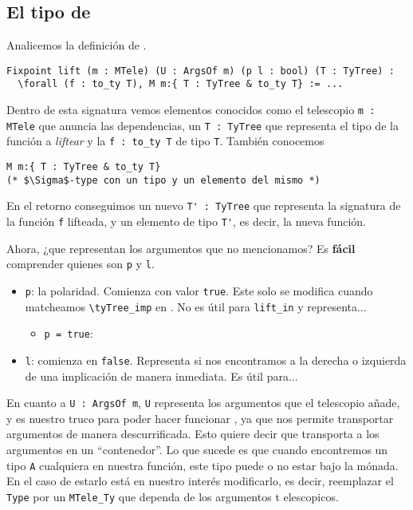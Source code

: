\subsection{El tipo de \lift}

Analicemos la definición de \lift.

\begin{lstlisting}
Fixpoint lift (m : MTele) (U : ArgsOf m) (p l : bool) (T : TyTree) :
  \forall (f : to_ty T), M m:{ T : TyTree & to_ty T} := ...
\end{lstlisting}

Dentro de esta signatura vemos elementos conocidos como el telescopio \lstinline{m : MTele} que anuncia las dependencias, un \lstinline{T : TyTree} que representa el tipo de la función a \textit{liftear} y la \lstinline{f : to_ty T} de tipo \lstinline{T}.
También conocemos
\begin{lstlisting}
M m:{ T : TyTree & to_ty T}
(* $\Sigma$-type con un tipo y un elemento del mismo *)
\end{lstlisting}

En el retorno conseguimos un nuevo \lstinline{T' : TyTree} que representa la signatura de la función \lstinline{f} lifteada, y un elemento de tipo \lstinline{T'}, es decir, la nueva función.

Ahora, ¿que representan los argumentos que no mencionamos? Es \textbf{fácil} comprender quienes son \lstinline{p} y \lstinline{l}.
\begin{itemize}
    \item \lstinline{p}: la polaridad. Comienza con valor \lstinline{true}. Este solo se modifica cuando matcheamos \lstinline{\tyTree_imp} en \lift. No es útil para \lstinline{lift_in} y representa...
    \begin{itemize}
        \item \lstinline{p = true}:
    \end{itemize}
    \item \lstinline{l}: comienza en \lstinline{false}. Representa si nos encontramos a la derecha o izquierda de una implicación de manera inmediata. Es útil para...
\end{itemize}

En cuanto a \lstinline{U : ArgsOf m}, \lstinline{U} representa los argumentos que el telescopio añade, y es nuestro truco para poder hacer funcionar \lift, ya que nos permite transportar argumentos de manera descurrificada.
Esto quiere decir que transporta a los argumentos en un ``contenedor''.
Lo que sucede es que cuando encontremos un tipo \lstinline{A} cualquiera en nuestra función, este tipo puede o no estar bajo la mónada.
En el caso de estarlo está en nuestro interés modificarlo, es decir, reemplazar el \lstinline{Type} por un \lstinline{MTele_Ty} que dependa de los argumentos t elescopicos.

